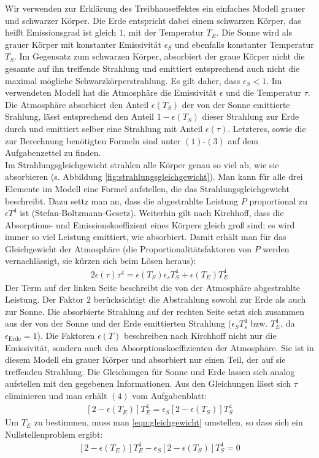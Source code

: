 \documentclass[10pt,a4paper]{article}
\begin{document}
Wir verwenden zur Erklärung des Treibhauseffektes ein einfaches Modell grauer und schwarzer Körper. Die Erde entspricht dabei einem schwarzen Körper, das heißt Emissionsgrad ist gleich $1$, mit der Temperatur $T_E$. Die Sonne wird als grauer Körper mit konstanter Emissivität $\epsilon_S$ und ebenfalls konstanter Temperatur $T_S$. Im Gegensatz zum schwarzen Körper, absorbiert der graue Körper nicht die gesamte auf ihn treffende Strahlung und emittiert entsprechend auch nicht die maximal mögliche Schwarzkörperstrahlung. Es gilt daher, dass $\epsilon_{S}<1$. Im verwendeten Modell hat die Atmosphäre die Emissivität $\epsilon$ und die Temperatur $\tau$. 
Die Atmosphäre absorbiert den Anteil $\epsilon(T_S)$ der von der Sonne emittierte Srahlung, lässt entsprechend den Anteil $1-\epsilon(T_S)$ dieser Strahlung zur Erde durch und emittiert selber eine Strahlung mit Anteil $\epsilon(\tau)$. Letzteres, sowie die zur Berechnung benötigten Formeln sind unter $(1)$-$(3)$ auf dem Aufgabenzettel zu finden.
\\
Im Strahlungsgleichgewicht strahlen alle Körper genau so viel ab, wie sie absorbieren (s. Abbildung \ref{fig:strahlungsgleichgewicht}). Man kann für alle drei Elemente im Modell eine Formel aufstellen, die das Strahlungsgleichgewicht beschreibt. Dazu settz man an, dass die abgestrahlte Leistung $P$ proportional zu $\epsilon T^4$ ist (Stefan-Boltzmann-Gesetz). Weiterhin gilt nach Kirchhoff, dass die Absorptions- und Emissionskoeffizient eines Körpers gleich groß sind; es wird immer so viel Leistung emittiert, wie absorbiert. Damit erhält man für das Gleichgewicht der Atmosphäre (die Proportionalitätsfaktoren von $P$ werden vernachlässigt, sie kürzen sich beim Lösen heraus):
\begin{align}
2\epsilon(\tau)\tau^4=\epsilon(T_S)\epsilon_s T_S^4+\epsilon(T_E)T_E^4
\end{align}
Der Term auf der linken Seite beschreibt die von der Atmosphäre abgestrahlte Leistung. Der Faktor $2$ berücksichtigt die Abstrahlung sowohl zur Erde als auch zur Sonne. Die absorbierte Strahlung auf der rechten Seite setzt sich zusammen aus der von der Sonne und der Erde emittierten Strahlung ($\epsilon_S T_s^4$ bzw. $T_E^4$, da $\epsilon_{\mathrm{Erde}}=1$). Die Faktoren $\epsilon(T)$ beschreiben nach Kirchhoff nicht nur die Emissivität, sondern auch den Absorptionskoeffizienten der Atmosphäre. Sie ist in diesem Modell ein grauer Körper und absorbiert nur einen Teil, der auf sie treffenden Strahlung. Die Gleichungen für Sonne und Erde lassen sich analog aufstellen mit den gegebenen Informationen.
Aus den Gleichungen lässt sich $\tau$ eliminieren und man erhält $(4)$ vom Aufgabenblatt:
\begin{align}
\left[2-\epsilon(T_E)\right]T_E^4=\epsilon_S\left[2-\epsilon(T_S)\right]T_S^4
\label{eqn:gleichgewicht}
\end{align}
Um $T_E$ zu bestimmen, muss man \ref{eqn:gleichgewicht} umstellen, so dass sich ein Nullstellenproblem ergibt:
\begin{align}
\left[2-\epsilon(T_E)\right]T_E^4-\epsilon_S\left[2-\epsilon(T_S)\right]T_S^4=0
\label{eqn:nullstellenform}
\end{align}
\end{document}
